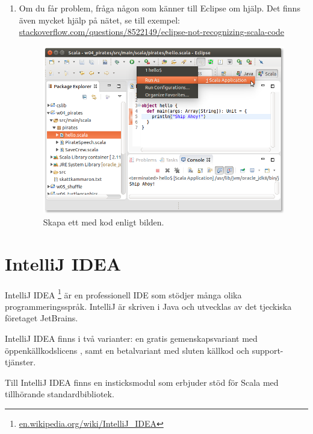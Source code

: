 \begin{enumerate}
\item Om du får problem, fråga någon som känner till Eclipse om hjälp. Det finns även mycket hjälp på nätet, se till exempel: \\ \href{http://stackoverflow.com/questions/8522149/eclipse-not-recognizing-scala-code}{stackoverflow.com/questions/8522149/eclipse-not-recognizing-scala-code}

\begin{figure}[H]
\centering
\includegraphics[width=1.0\textwidth]{../img/eclipse/eclipse-pirates-hello.png} 
\caption {Skapa ett  med kod enligt bilden.}
\label{fig:eclipse:pirates-hi}
\end{figure}


\end{enumerate}



\newpage

\section{IntelliJ IDEA}\label{appendix:ide:intellij}

IntelliJ IDEA%
\footnote{\href{https://en.wikipedia.org/wiki/IntelliJ_IDEA}{en.wikipedia.org/wiki/IntelliJ\_IDEA}}
 är en professionell IDE som stödjer många olika programmeringsspråk. IntelliJ är skriven i Java och utvecklas av det tjeckiska företaget JetBrains. 

IntelliJ IDEA finns i två varianter: en gratis gemenskapsvariant med öppenkällkodslicens , samt en betalvariant med sluten källkod och support-tjänster.


Till IntelliJ IDEA finns en insticksmodul  som erbjuder stöd för Scala med tillhörande standardbibliotek.

